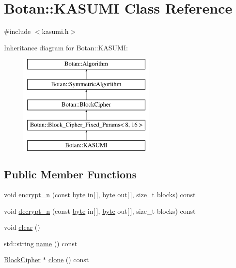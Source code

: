 \hypertarget{classBotan_1_1KASUMI}{\section{Botan\-:\-:K\-A\-S\-U\-M\-I Class Reference}
\label{classBotan_1_1KASUMI}
}


{\ttfamily \#include $<$kasumi.\-h$>$}

Inheritance diagram for Botan\-:\-:K\-A\-S\-U\-M\-I\-:\begin{figure}[H]
\begin{center}
\leavevmode
\includegraphics[height=5.000000cm]{classBotan_1_1KASUMI}
\end{center}
\end{figure}
\subsection*{Public Member Functions}
\begin{DoxyCompactItemize}
\item 
void \hyperlink{classBotan_1_1KASUMI_a323c2b6f298d6ca7e477f1c0c410d9f7}{encrypt\-\_\-n} (const \hyperlink{namespaceBotan_a7d793989d801281df48c6b19616b8b84}{byte} in\mbox{[}$\,$\mbox{]}, \hyperlink{namespaceBotan_a7d793989d801281df48c6b19616b8b84}{byte} out\mbox{[}$\,$\mbox{]}, size\-\_\-t blocks) const 
\item 
void \hyperlink{classBotan_1_1KASUMI_a82da186b535cea633391bcd626b2461c}{decrypt\-\_\-n} (const \hyperlink{namespaceBotan_a7d793989d801281df48c6b19616b8b84}{byte} in\mbox{[}$\,$\mbox{]}, \hyperlink{namespaceBotan_a7d793989d801281df48c6b19616b8b84}{byte} out\mbox{[}$\,$\mbox{]}, size\-\_\-t blocks) const 
\item 
void \hyperlink{classBotan_1_1KASUMI_a654e996d6401d16e8f53cf09c9e77971}{clear} ()
\item 
std\-::string \hyperlink{classBotan_1_1KASUMI_a5f64baa4dcaf3fc482fcb4908675f375}{name} () const 
\item 
\hyperlink{classBotan_1_1BlockCipher}{Block\-Cipher} $\ast$ \hyperlink{classBotan_1_1KASUMI_ae75d5df28590234a068883714c637a84}{clone} () const 
\end{DoxyCompactItemize}
